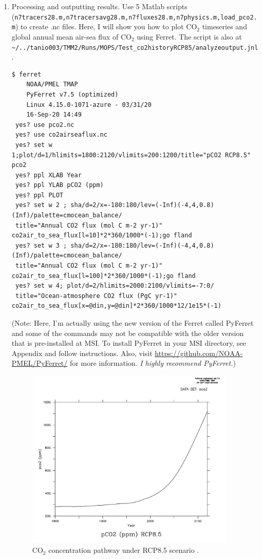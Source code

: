 \documentclass[a4paper]{article}
\begin{document}
\begin{enumerate}
\item Processing and outputting results. Use 5 Matlab scripts \\ (\verb|n7tracers28.m,n7tracersavg28.m,n7fluxes28.m,n7physics.m,load_pco2.m|) to create .nc files. Here, I will show you how to plot $\mathrm{CO_{2}}$ timeseries and global annual mean air-sea flux of $\mathrm{CO_{2}}$ using Ferret. The script is also at \verb|~/../tanio003/TMM2/Runs/MOPS/Test_co2historyRCP85/analyzeoutput.jnl|. 
\begin{lstlisting}[style=DOS]
 $ ferret
  	NOAA/PMEL TMAP
 	PyFerret v7.5 (optimized)
 	Linux 4.15.0-1071-azure - 03/31/20
 	16-Sep-20 14:49
 yes? use pco2.nc
 yes? use co2airseaflux.nc
 yes? set w 1;plot/d=1/hlimits=1800:2120/vlimits=200:1200/title="pCO2 RCP8.5" pco2
 yes? ppl XLAB Year
 yes? ppl YLAB pCO2 (ppm)
 yes? ppl PLOT
 yes? set w 2 ; sha/d=2/x=-180:180/lev=(-Inf)(-4,4,0.8)(Inf)/palette=cmocean_balance/
 title="Annual CO2 flux (mol C m-2 yr-1)" co2air_to_sea_flux[l=10]*2*360/1000*(-1);go fland
 yes? set w 3 ; sha/d=2/x=-180:180/lev=(-Inf)(-4,4,0.8)(Inf)/palette=cmocean_balance/
 title="Annual CO2 flux (mol C m-2 yr-1)" co2air_to_sea_flux[l=100]*2*360/1000*(-1);go fland
 yes? set w 4; plot/d=2/hlimits=2000:2100/vlimits=-7:0/
 title="Ocean-atmosphere CO2 flux (PgC yr-1)" co2air_to_sea_flux[x=@din,y=@din]*2*360/1000*12/1e15*(-1)
\end{lstlisting}
(Note: Here, I'm actually using the new version of the Ferret called PyFerret and some of the commands may not be compatible with the older version that is pre-installed at MSI. To install PyFerret in your MSI directory, see Appendix and follow instructions. Also, visit \url{https://github.com/NOAA-PMEL/PyFerret/} for more information. \emph{I highly recommend PyFerret.})

\begin{figure}[b!]   %
   \centering
   \includegraphics[width=10cm]{pco2RCP85.pdf}
   \caption[]{$\mathrm{CO_2}$ concentration pathway under RCP8.5 scenario \citep{Meinshausen11}.}
   \label{fig:pco2RCP85}
\end{figure}


\end{enumerate}
\end{document}
